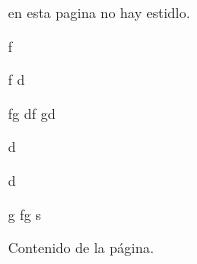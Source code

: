 \documentclass[10pt,a4paper]{report}
\begin{document}
en esta pagina no hay estidlo.

f

f
d

 \pagebreak
fg
df
gd


d


 \pagebreak
d


g
fg
s


    \thispagestyle{fancy}
    Contenido de la página.
\end{document}
